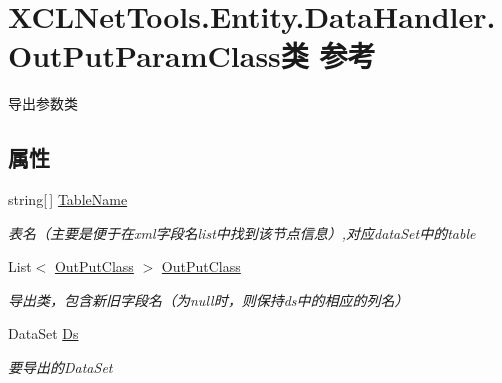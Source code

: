 \hypertarget{class_x_c_l_net_tools_1_1_entity_1_1_data_handler_1_1_out_put_param_class}{\section{X\-C\-L\-Net\-Tools.\-Entity.\-Data\-Handler.\-Out\-Put\-Param\-Class类 参考}
\label{class_x_c_l_net_tools_1_1_entity_1_1_data_handler_1_1_out_put_param_class}
}


导出参数类  


\subsection*{属性}
\begin{DoxyCompactItemize}
\item 
string\mbox{[}$\,$\mbox{]} \hyperlink{class_x_c_l_net_tools_1_1_entity_1_1_data_handler_1_1_out_put_param_class_a26c55a710bc326b9b4a40b0e868af278}{Table\-Name}
\begin{DoxyCompactList}\small\item\em 表名（主要是便于在xml字段名list中找到该节点信息）,对应data\-Set中的table \end{DoxyCompactList}\item 
List$<$ \hyperlink{class_x_c_l_net_tools_1_1_entity_1_1_data_handler_1_1_out_put_class}{Out\-Put\-Class} $>$ \hyperlink{class_x_c_l_net_tools_1_1_entity_1_1_data_handler_1_1_out_put_param_class_a798a566c1bbaab605cdb0c2c815e48d9}{Out\-Put\-Class}
\begin{DoxyCompactList}\small\item\em 导出类，包含新旧字段名（为null时，则保持ds中的相应的列名） \end{DoxyCompactList}\item 
Data\-Set \hyperlink{class_x_c_l_net_tools_1_1_entity_1_1_data_handler_1_1_out_put_param_class_a7cf4ee80913a37cdbfa871bc47069114}{Ds}
\begin{DoxyCompactList}\small\item\em 要导出的\-Data\-Set \end{DoxyCompactList}\item 

\end{DoxyCompactItemize}
